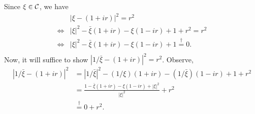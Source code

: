 \documentclass{homework}
\begin{document}
\begin{solution}
Since $\xi \in \mathcal C$, we have
\begin{align*}
  &|\xi - (1+ir)|^2 = r^2 \\
  \iff & |\xi|^2 - \bar \xi(1+ir) - \xi(1-ir) + 1 + r^2 = r^2\\
  \iff & |\xi|^2 - \bar \xi(1+ir) - \xi(1-ir) + 1 \stackrel\dagger= 0.\\
\end{align*}
Now, it will suffice to show $|1/\bar\xi - (1+ir)|^2 = r^2$.  Observe,
\begin{align*}
  |1/\bar\xi - (1+ir)|^2 
  &= |1/\bar\xi|^2 - (1/\xi)(1+ir) - (1/\bar\xi)(1-ir) + 1 + r^2\\
  &= \frac{1 - \bar\xi(1+ir) - \xi(1-ir) + |\xi|^2}{|\xi|^2} + r^2\\
  &\stackrel\dagger= 0 + r^2.
\end{align*}


\end{solution}

\end{document}

